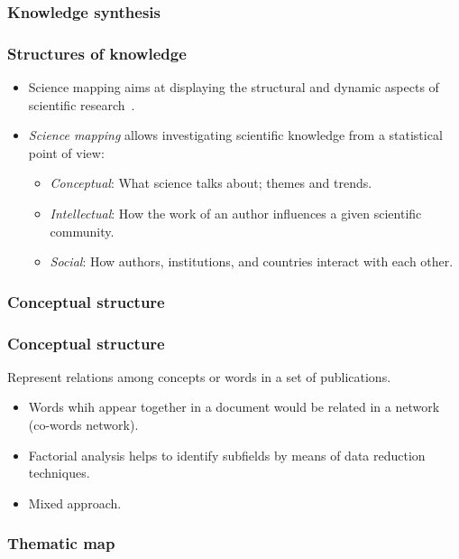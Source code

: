 \documentclass[aspectratio=169]{beamer}
\begin{document}
\subsubsection{Knowledge synthesis}


\begin{frame}
	\frametitle{Structures of knowledge}
	\begin{itemize}
		\item Science mapping aims at displaying the structural and dynamic aspects of
		      scientific research~\cite{borner2003}.
		\item \emph{Science mapping} allows investigating scientific knowledge from a
		      statistical point of view:
		      \begin{itemize}
			      \item \emph{Conceptual}: What science talks about; themes and 
                      trends.
			      \item \emph{Intellectual}: How the work of an author 
                      influences a given scientific community.
			      \item \emph{Social}: How authors, institutions, and countries 
                      interact with each other.
		      \end{itemize}
	\end{itemize}
\end{frame}


\subsubsection{Conceptual structure}


\begin{frame}
	\frametitle{Conceptual structure}
	Represent relations among concepts or words in a set of publications.
    \begin{itemize}
        \item Words whih appear together in a document would be related in a 
            network (co-words network). 
        \item Factorial analysis helps to identify subfields by means of data
            reduction techniques.
        \item Mixed approach.
    \end{itemize}
\end{frame}


\subsubsection{Thematic map}
\end{document}
